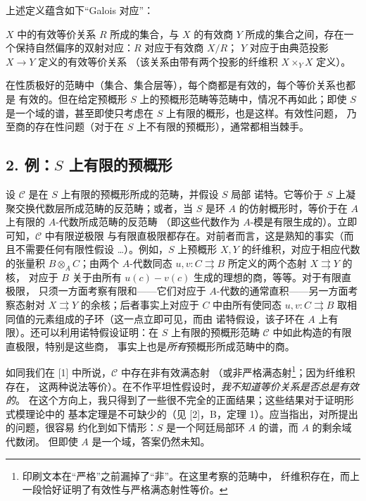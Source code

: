 上述定义蕴含如下“Galois 对应”：

 $X$ 中的有效等价关系 $R$ 所成的集合，与 $X$ 的有效商 $Y$
所成的集合之间，存在一个保持自然偏序的双射对应：$R$ 对应于有效商 $X/R$；
$Y$ 对应于由典范投影 $X\longrightarrow Y$ 定义的有效等价关系
（该关系由带有两个投影的纤维积 $X\times_Y X$ 定义）。

在性质极好的范畴中（集合、集合层等），每个商都是有效的，每个等价关系也都是
有效的。但在给定预概形 $S$ 上的预概形范畴等范畴中，情况不再如此；即使 $S$
是一个域的谱，甚至即使只考虑在 $S$ 上有限的概形，也是这样。有效性问题，
乃至商的存在性问题（对于在 $S$ 上不有限的预概形），通常都相当棘手。

\subsection*{2. 例：$S$ 上有限的预概形}

设 $\mathcal C$ 是在 $S$ 上有限的预概形所成的范畴，并假设 $S$ 局部
诺特。它等价于 $S$ 上凝聚交换代数层所成范畴的反范畴；或者，当 $S$ 是环
$A$ 的仿射概形时，等价于在 $A$ 上有限的 $A$-代数所成范畴的反范畴
（即这些代数作为 $A$-模是有限生成的）。立即可知，$\mathcal C$ 中有限逆极限
与有限直极限都存在。对前者而言，这是熟知的事实（而且不需要任何有限性假设
\ldots）。例如，$S$ 上预概形 $X,Y$ 的纤维积，对应于相应代数的张量积
$B\otimes_A C$；由两个 $A$-代数同态
$u,v:C\rightrightarrows B$ 所定义的两个态射 $X\rightrightarrows Y$ 的核，
对应于 $B$ 关于由所有 $u(c)-v(c)$ 生成的理想的商，等等。对于有限直极限，
只须一方面考察有限和——它们对应于 $A$-代数的通常直积——另一方面考察态射对
$X\rightrightarrows Y$ 的余核；后者事实上对应于 $C$ 中由所有使同态
$u,v:C\rightrightarrows B$ 取相同值的元素组成的子环（这一点立即可见，而由
诺特假设，该子环在 $A$ 上有限）。还可以利用诺特假设证明：在
$S$ 上有限的预概形范畴 $\mathcal C$ 中如此构造的有限直极限，特别是这些商，
事实上也是\emph{所有}预概形所成范畴中的商。

如同我们在 [1] 中所说，$\mathcal C$ 中存在非有效满态射
（或非严格满态射\footnote{印刷文本在“严格”之前漏掉了“非”。在这里考察的范畴中，
纤维积存在，而上一段恰好证明了有效性与严格满态射性等价。}；因为纤维积存在，
这两种说法等价）。在不作平坦性假设时，\emph{我不知道等价关系是否总是有效的}。
在这个方向上，我只得到了一些很不完全的正面结果；这些结果对于证明形式模理论中的
基本定理是不可缺少的（见 [2]，B，定理 1）。应当指出，对所提出的问题，很容易
约化到如下情形：$S$ 是一个阿廷局部环 $A$ 的谱，而 $A$ 的剩余域代数闭。
但即使 $A$ 是一个域，答案仍然未知。

